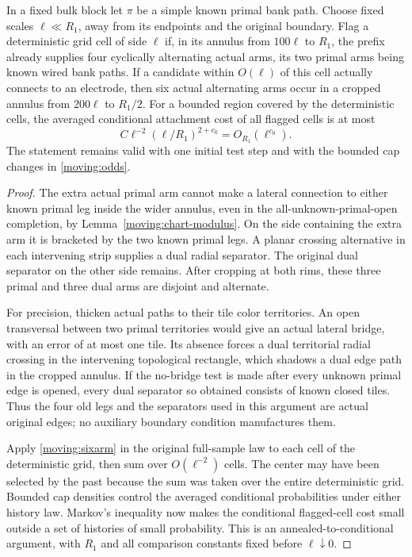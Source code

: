 \begin{lemma}\label{moving:flags}
In a fixed bulk block let $\pi$ be a simple known primal bank path.
Choose fixed scales $\ell\ll R_1$, away from its endpoints and the
original boundary.  Flag a deterministic grid cell of side $\ell$
if, in its annulus from $100\ell$ to $R_1$, the prefix already supplies
four cyclically alternating actual arms, its two primal arms being
known wired bank paths.  If a candidate within $O(\ell)$ of this cell
actually connects to an electrode, then six actual alternating arms
occur in a cropped annulus from $200\ell$ to $R_1/2$.
For a bounded region covered by the deterministic cells, the averaged
conditional attachment cost of all flagged cells is at most
\begin{equation}\label{moving:flag-sum}
 C\ell^{-2}(\ell/R_1)^{2+c_0}=O_{R_1}(\ell^{c_0}).
\end{equation}
The statement remains valid with one initial test step and with the
bounded cap changes in \eqref{moving:odds}.
\end{lemma}
\begin{proof}
The extra actual primal arm cannot make a lateral connection to
either known primal leg inside the wider annulus, even in the
all-unknown-primal-open completion, by
Lemma~\ref{moving:chart-modulus}.  On the side containing the extra
arm it is bracketed by the two known primal legs.  A planar crossing
alternative in each intervening strip supplies a dual radial
separator.  The original dual separator on the other side remains.
After cropping at both rims, these three primal and three dual arms
are disjoint and alternate.

For precision, thicken actual paths to their tile color territories.
An open transversal between two primal territories would give an
actual lateral bridge, with an error of at most one tile.  Its absence
forces a dual territorial radial crossing in the intervening
topological rectangle, which shadows a dual edge path in the cropped
annulus.  If the no-bridge test is made after every unknown primal
edge is opened, every dual separator so obtained consists of known
closed tiles.  Thus the four old legs and the separators used in
this argument are actual original edges; no auxiliary boundary
condition manufactures them.

Apply \eqref{moving:sixarm} in the original full-sample law to each
cell of the deterministic grid, then sum over $O(\ell^{-2})$ cells.
The center may have been selected by the past because the sum was
taken over the entire deterministic grid.  Bounded cap densities
control the averaged conditional probabilities under either history
law.  Markov's inequality now makes the conditional flagged-cell
cost small outside a set of histories of small probability.  This
is an annealed-to-conditional argument, with $R_1$ and all comparison
constants fixed before $\ell\downarrow0$.
\end{proof}

